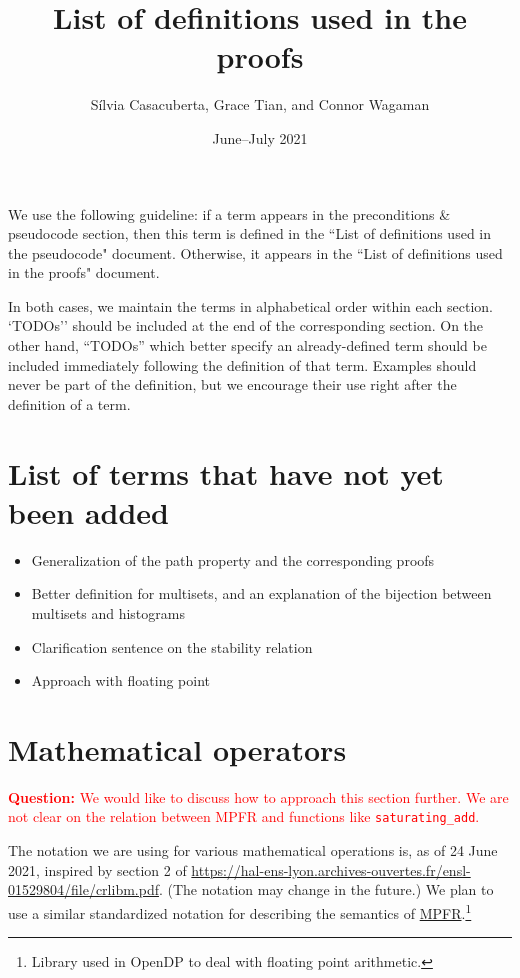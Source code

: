 \documentclass[11pt,a4paper]{article}
\title{List of definitions used in the proofs}
\author{S\'ilvia Casacuberta, Grace Tian, and Connor Wagaman}
\date{June--July 2021}
\theoremstyle{definition}
\newcommand{\questionc}[1]{\textcolor{red}{\textbf{Question:} #1}}
\begin{document}
\maketitle

We use the following guideline: if a term appears in the preconditions \& pseudocode section, then this term is defined in the ``List of definitions used in the pseudocode" document. Otherwise, it appears in the ``List of definitions used in the proofs" document. 

In both cases, we maintain the terms in alphabetical order within each section. `TODOs'' should be included at the end of the corresponding section. On the other hand, ``TODOs'' which better specify an already-defined term should be included immediately following the definition of that term. Examples should never be part of the definition, but we encourage their use right after the definition of a term.

\tableofcontents

\section*{List of terms that have not yet been added}
\begin{itemize}
\item Generalization of the path property and the corresponding proofs
\item Better definition for multisets, and an explanation of the bijection between multisets and histograms
\item Clarification sentence on the stability relation
\item Approach with floating point
\end{itemize}

\section{Mathematical operators}
\questionc{We would like to discuss how to approach this section further. We are not clear on the relation between MPFR and functions like \texttt{saturating\_add}.}

The notation we are using for various mathematical operations is, as of 24 June 2021, inspired by section 2 of \url{https://hal-ens-lyon.archives-ouvertes.fr/ensl-01529804/file/crlibm.pdf}. (The notation may change in the future.) We plan to use a similar standardized notation for describing the semantics of \href{https://www.mpfr.org/}{MPFR}.\footnote{Library used in OpenDP to deal with floating point arithmetic.}
\end{document}

